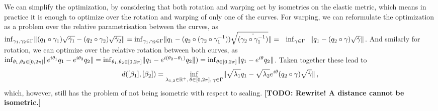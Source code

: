 We can simplify the optimization, by considering that both rotation and warping act by isometries on the elastic metric, which means in practice it is enough to optimize over the rotation and warping of only one of the curves.
For warping, we can reformulate the optimization as a problem over the relative parametrisation between the curves, as $\inf_{\gamma_1,\gamma_2 \in \Gamma} \lVert(q_1 \circ \gamma_1) \sqrt{\dot\gamma_1} - (q_2 \circ \gamma_2) \sqrt{\dot\gamma_2}\rVert = \inf_{\gamma_1,\gamma_2 \in \Gamma} \lVert q_1 - (q_2 \circ (\gamma_2 \circ \gamma_1^{-1})) \sqrt{\dot{(\gamma_2 \circ \gamma_1^{-1})}}\rVert= \,\,\,\,\inf_{\gamma \in \Gamma} \,\,\,\, \lVert q_1 - (q_2 \circ \gamma) \sqrt{\dot\gamma}\rVert$.
And smilarly for rotation, we can optimize over the relative rotation between both curves, as
$\inf_{\theta_1,\theta_2 \in [0,2\pi]} \lVert e^{i\theta_1}q_1 - e^{i\theta_2}q_2\rVert = \inf_{\theta_1, \theta_2 \in [0,2\pi]} \lVert q_1 - e^{i(\theta_2 - \theta_1)}q_2\rVert ) = \inf_{\theta \in [0,2\pi]} \lVert q_1 - e^{i\theta}q_2\rVert$.
Taken together these lead to
$$d([\beta_1], [\beta_2]) = 
  \inf_{\lambda_{1,2} \in \mathbb{R}^+,\,\theta \in [0,2\pi],\, \gamma \in \Gamma} \lVert \sqrt{\lambda_1}q_1 - \sqrt{\lambda_2} e^{i\theta}(q_2 \circ \gamma) \sqrt{\dot\gamma}\rVert\,,$$
which, however, still has the problem of not being isometric with respect to scaling.
\textbf{[TODO: Rewrite! A distance cannot be isometric.]}

